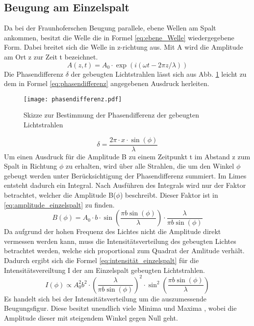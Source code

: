 \subsection{Beugung am Einzelspalt}
Da bei der Fraunhoferschen Beugung parallele, ebene Wellen am Spalt ankommen, besitzt die Welle die in Formel \eqref{eq:ebene_Welle} wiedergegebene Form. Dabei breitet sich die Welle in z-richtung aus. Mit A wird die Amplitude am Ort z zur Zeit t bezeichnet.
%
\begin{equation}
A(z,t) = A_0 \cdot \exp(i(\omega t - 2 \pi z / \lambda))
\label{eq:ebene_Welle}
\end{equation}
%
Die Phasendifferenz $\delta$ der gebeugten Lichtstrahlen lässt sich aus Abb. \ref{fig:phasendifferenz} leicht zu dem in Formel \eqref{eq:phasendifferenz} angegebenen Ausdruck herleiten.
\begin{figure}
\centering
\texttt{[image: phasendifferenz.pdf]}
\caption{Skizze zur Bestimmung der Phasendifferenz der gebeugten Lichtstrahlen}
\label{fig:phasendifferenz}
\end{figure}
%
\begin{equation}
\delta  = \frac{2 \pi \cdot x \cdot \sin(\phi)}{\lambda}
\label{eq:phasendifferenz}
\end{equation}
%
Um einen Ausdruck für die Amplitude B zu einem Zeitpunkt t im Abstand z zum Spalt in Richtung $\phi$ zu erhalten, wird über alle Strahlen, die um den Winkel $\phi$ gebeugt werden unter Berücksichtigung der Phasendifferenz summiert. Im Limes entsteht dadurch ein Integral. Nach Ausführen des Integrals wird nur der Faktor betrachtet, welcher die Amplitude B($\phi$) beschreibt. Dieser Faktor ist in \eqref{eq:amplitude_einzelspalt} zu finden.
%
\begin{equation}
B(\phi) = A_0 \cdot b \cdot \sin\left(\frac{\pi b \sin(\phi)}{\lambda}\right) \cdot \frac{\lambda}{\pi b \sin(\phi)}
\label{eq:amplitude_einzelspalt}
\end{equation}
%
 Da aufgrund der hohen Frequenz des Lichtes nicht die Amplitude direkt vermessen werden kann, muss die Intensitätsverteilung des gebeugten Lichtes betrachtet werden, welche sich proportional zum Quadrat der Amlitude verhält. Dadurch ergibt sich die Formel \eqref{eq:intensität_einzelspalt} für die Intensitätsvereiltung I der am Einzelspalt gebeugten Lichtstrahlen.
%
\begin{equation}
I(\phi) \propto A_{0}^2 b^2 \cdot \left(\frac{\lambda}{\pi b \sin(\phi)}\right)^2 \cdot \sin^2\left(\frac{\pi b \sin(\phi)}{\lambda}\right)
\label{eq:intensität_einzelspalt}
\end{equation}
%
Es handelt sich bei der Intensitätsverteilung um die auszumessende Beugungsfigur. Diese besitzt unendlich viele Minima und Maxima , wobei die Amplitude dieser mit steigendem Winkel gegen Null geht.
%
